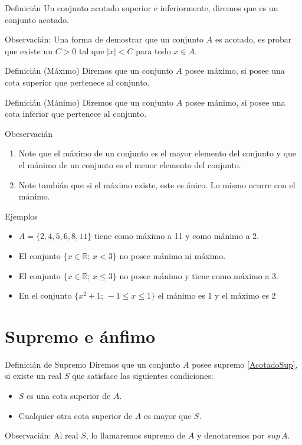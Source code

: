 \documentclass[5pt]{article} %
\begin{document}
	{Definicián} Un conjunto acotado superior e inferiormente, diremos que es un conjunto acotado.


	Observacián: Una forma de demostrar que un conjunto $A$ es acotado, es probar que existe un $C>0$ tal que $|x| < C$ para todo $x\in A$.

	{Definicián (Máximo)}
		Diremos que un conjunto $A$ posee máximo, si posee una cota superior
		que pertenece al conjunto.

	{Definicián (Mánimo)}
	Diremos que un conjunto $A$ posee mánimo, si posee una cota inferior que
	pertenece al conjunto.




{Obeservacián}
\begin{enumerate}
	\item Note que el máximo de un conjunto es el mayor elemento del conjunto
	y que el mánimo de un conjunto es el menor elemento del conjunto.

	\item Note tambián que si el máximo existe, este es ánico. Lo mismo ocurre con el mánimo.
\end{enumerate}
	

	{Ejemplos}
		\begin{itemize}
			\item $A=\{2,4,5,6,8,11\}$ tiene como máximo a 11 y como mánimo a 2.
			\item El conjunto $\{x\in\mathbb{R};\, x<3\}$ no posee mánimo ni máximo.
			\item El conjunto $\{x\in\mathbb{R};\, x\leq3\}$ no posee mánimo y tiene como máximo a 3.

			\item En el conjunto $\{x^2+1;\, -1\leq x\leq 1\}$ el mánimo es 1 y el máximo es 2
		\end{itemize}
	



\section{Supremo e ánfimo}
{Definicián de Supremo}
	Diremos que un conjunto $A$ posee supremo \eqref{AcotadoSup}, si existe un real $S$ que satisface
	las siguientes condiciones:
	\begin{itemize}
		\item $S$ es una cota superior de $A$.
		\item Cualquier otra cota superior de $A$ es mayor que $S$.
	\end{itemize}
Observacián: Al real $S$, lo llamaremos supremo de $A$ y denotaremos por $sup\,A$.
\end{document}
